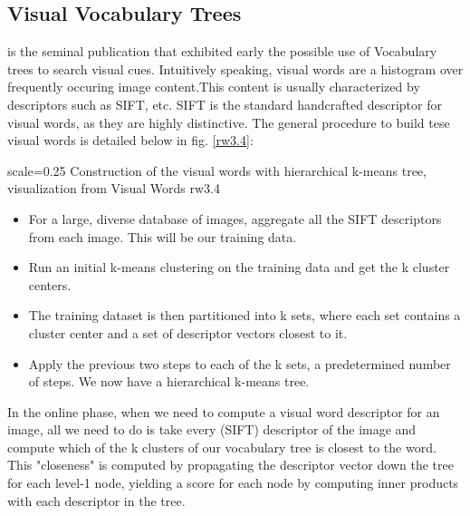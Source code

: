 
\subsection{Visual Vocabulary Trees} %

\cite{Nister2006} is the seminal publication that exhibited early the possible use of Vocabulary trees to search visual cues. Intuitively speaking, visual words are a histogram over frequently occuring image content.This content is usually characterized by descriptors such as SIFT, etc.
SIFT is the standard handcrafted descriptor for visual words, as they are highly distinctive. The general procedure to build tese visual words is detailed below in fig. \ref{rw3.4}:

{scale=0.25}%
{Construction of the visual words with hierarchical k-means tree, visualization from \cite{Nister2006}}%
{Visual Words}%
{rw3.4} %

\begin{itemize}
	\item For a large, diverse database of images, aggregate all the SIFT descriptors from each image. This will be our training data.\\
	\item Run an initial k-means clustering on the training data and get the k cluster centers.\\
	\item The training dataset is then partitioned into k sets, where each set contains a cluster center and a set of descriptor vectors closest to it.\\
	\item Apply the previous two steps to each of the k sets, a predetermined number of steps. We now have a hierarchical k-means tree.\\
\end{itemize}

In the online phase, when we need to compute a visual word descriptor for an image, all we need to do is take every (SIFT) descriptor of the image and compute 
which of the k clusters of our vocabulary tree is closest to the word. This "closeness" is computed by propagating the descriptor vector down the tree for each 
level-1 node, yielding a score for each node by computing inner products with each descriptor in the tree.

